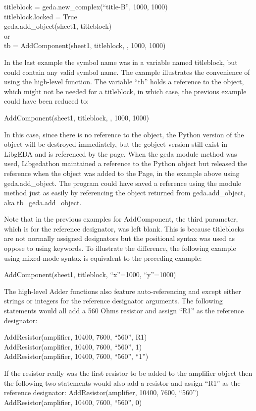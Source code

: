titleblock = geda.new\_complex(``title-B'', 1000, 1000)\\ 
 titleblock.locked = True\\ 
 geda.add\_object(sheet1, titleblock)\\ 
 or\\ 
tb = AddComponent(sheet1, titleblock, , 1000, 1000)


  In the last example the symbol name was in a variable named titleblock, but could contain any valid symbol name. The example illustrates the convenience of using the high-level function. The variable ``tb'' holds a reference to the object, which might not be needed for a titleblock, in which case, the previous example could have been reduced to:

AddComponent(sheet1, titleblock, , 1000, 1000)


  In this case, since there is no reference to the object, the Python version of the object will be destroyed immediately, but the gobject version still exist in LibgEDA and is referenced by the page. When the geda module method was used, Libgedathon maintained a reference to the Python object but released the reference when the object was added to the Page, in the example above using geda.add\_object. The program could have saved a reference using the module method just as easily by referencing the object returned from geda.add\_object, aka tb=geda.add\_object. 


  Note that in the previous examples for AddComponent, the third parameter, which is for the reference designator, was left blank. This is because titleblocks are not normally assigned designators but the positional syntax was used as oppose to using keywords. To illustrate the difference, the following example using mixed-mode syntax is equivalent to the preceding example:

AddComponent(sheet1, titleblock, ``x''=1000, ``y''=1000)


  The high-level Adder functions also feature auto-referencing and except either strings or integers for the reference designator arguments. The following statements would all add a 560 Ohms resistor and assign ``R1'' as the reference designator:

AddResistor(amplifier, 10400, 7600, ``560'', R1)
\\ 
AddResistor(amplifier, 10400, 7600, ``560'', 1)
\\ 
AddResistor(amplifier, 10400, 7600, ``560'', ``1'')


  If the resistor really was the first resistor to be added to the amplifier object then the following two statements would also add a resistor and assign ``R1'' as the reference designator: 
AddResistor(amplifier, 10400, 7600, ``560'')
\\ 
AddResistor(amplifier, 10400, 7600, ``560'', 0)


